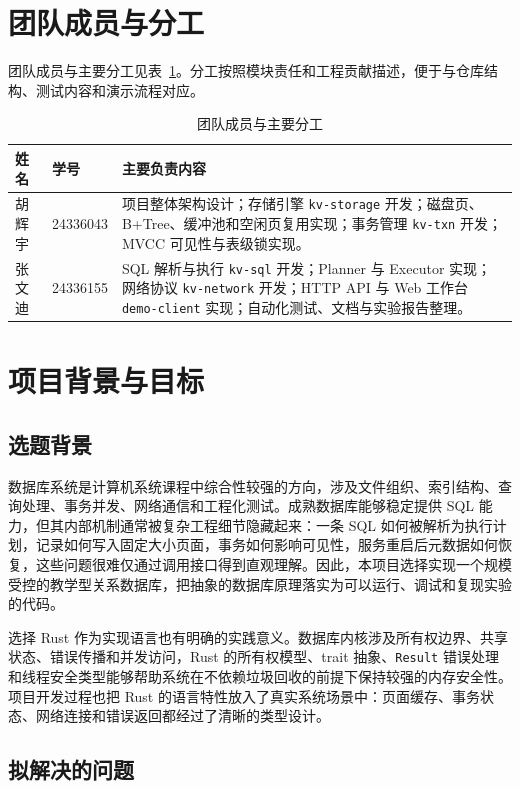 \documentclass[UTF8,a4paper,12pt]{ctexart}
\newcommand{\code}[1]{\texttt{#1}}
\begin{document}
\section{团队成员与分工}

团队成员与主要分工见表~\ref{tab:members}。分工按照模块责任和工程贡献描述，便于与仓库结构、测试内容和演示流程对应。

\begin{table}[H]
\centering
\caption{团队成员与主要分工}
\label{tab:members}
\begin{tabularx}{\textwidth}{p{2.5cm}p{2.8cm}X}
\toprule
姓名 & 学号 & 主要负责内容\\
\midrule
胡辉宇 & 24336043 & 项目整体架构设计；存储引擎 \code{kv-storage} 开发；磁盘页、B+Tree、缓冲池和空闲页复用实现；事务管理 \code{kv-txn} 开发；MVCC 可见性与表级锁实现。\\
张文迪 & 24336155 & SQL 解析与执行 \code{kv-sql} 开发；Planner 与 Executor 实现；网络协议 \code{kv-network} 开发；HTTP API 与 Web 工作台 \code{demo-client} 实现；自动化测试、文档与实验报告整理。\\
\bottomrule
\end{tabularx}
\end{table}

\section{项目背景与目标}

\subsection{选题背景}

数据库系统是计算机系统课程中综合性较强的方向，涉及文件组织、索引结构、查询处理、事务并发、网络通信和工程化测试。成熟数据库能够稳定提供 SQL 能力，但其内部机制通常被复杂工程细节隐藏起来：一条 SQL 如何被解析为执行计划，记录如何写入固定大小页面，事务如何影响可见性，服务重启后元数据如何恢复，这些问题很难仅通过调用接口得到直观理解。因此，本项目选择实现一个规模受控的教学型关系数据库，把抽象的数据库原理落实为可以运行、调试和复现实验的代码。

选择 Rust 作为实现语言也有明确的实践意义。数据库内核涉及所有权边界、共享状态、错误传播和并发访问，Rust 的所有权模型、trait 抽象、\code{Result} 错误处理和线程安全类型能够帮助系统在不依赖垃圾回收的前提下保持较强的内存安全性。项目开发过程也把 Rust 的语言特性放入了真实系统场景中：页面缓存、事务状态、网络连接和错误返回都经过了清晰的类型设计。

\subsection{拟解决的问题}
\end{document}
